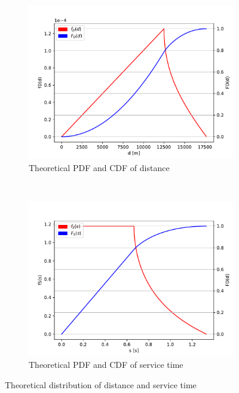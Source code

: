 \documentclass[a4paper,12pt]{article}
\begin{document}
\begin{figure}[H]
  \centering
  \begin{subfigure}[b]{0.45\textwidth}
    \centering
    \includegraphics[width=\textwidth]{img/distance.pdf}
    \caption{Theoretical PDF and CDF of distance}
    \label{fig:pdfcdf-distance}
  \end{subfigure}
  ~
  \begin{subfigure}[b]{0.45\textwidth}
    \centering
    \includegraphics[width=\textwidth]{img/servicetime.pdf}
    \caption{Theoretical PDF and CDF of service time}
    \label{fig:pdfcdf-servicetime}
  \end{subfigure}
  \caption{Theoretical distribution of distance and service time}
  \label{fig:d}
\end{figure}
\end{document}
